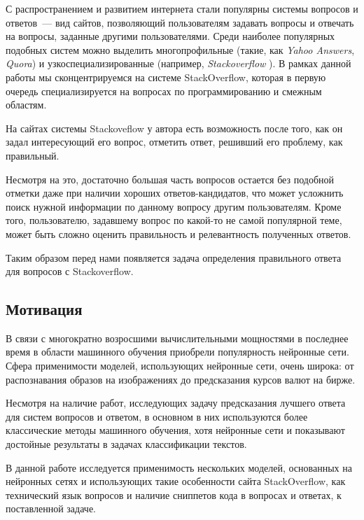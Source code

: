 \documentclass[../diploma.tex]{subfiles}
\begin{document}
        
	\label{sec:introduction}

    С распространением и развитием интернета стали популярны системы вопросов и ответов~--- вид сайтов, 
    позволяющий пользователям задавать вопросы и отвечать на вопросы, заданные другими пользователями.
    Среди наиболее популярных подобных систем можно выделить многопрофильные (такие, как \textit{Yahoo Answers}, \textit{Quora}) 
    и узкоспециализированные (например, \textit{Stackoverflow} \cite{online:stackoverflow}).
    В рамках данной работы мы сконцентрируемся на системе StackOverflow, 
    которая в первую очередь специализируется на вопросах по программированию и смежным областям.

    На сайтах системы Stackoveflow у автора есть возможность после того, как он задал интересующий его вопрос, отметить ответ, решивший его проблему, как правильный.
    
    Несмотря на это, достаточно большая часть вопросов остается без подобной отметки даже при наличии хороших ответов-кандидатов, 
    что может усложнить поиск нужной информации по данному вопросу другим пользователям. 
    Кроме того, пользователю, задавшему вопрос по какой-то не самой популярной теме, может быть сложно оценить правильность и релевантность полученных ответов.

    Таким образом перед нами появляется задача определения правильного ответа для вопросов с Stackoverflow.
       
    \subsection*{Мотивация}
	
	В связи с многократно возросшими вычислительными мощностями в последнее время в области машинного обучения приобрели популярность нейронные сети.
    Сфера применимости моделей, использующих нейронные сети, очень широка: от распознавания образов на изображениях до предсказания курсов валют на бирже.

    Несмотря на наличие работ, исследующих задачу предсказания лучшего ответа для систем вопросов и ответом, в основном в них используются более классические методы машинного обучения,
    хотя нейронные сети и показывают достойные результаты в задачах классификации текстов.

    В данной работе исследуется применимость нескольких моделей, основанных на нейронных сетях и использующих такие особенности сайта StackOverflow, 
    как технический язык вопросов и наличие сниппетов кода в вопросах и ответах, к поставленной задаче.
\end{document}
